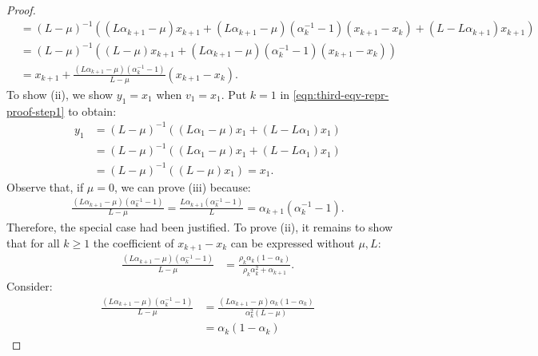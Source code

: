 \documentclass[12pt]{article}
\begin{document}
\begin{proof}
{\begin{align*}
                &= (L - \mu)^{-1}
                \left(
                    (L\alpha_{k + 1} - \mu)x_{k + 1} +
                    (L\alpha_{k + 1} - \mu)(\alpha_k^{-1} - 1)(x_{k + 1} - x_k)
                    + (L - L \alpha_{k + 1})x_{k + 1}
                \right)
                \\
                &=
                (L - \mu)^{-1}
                \left(
                    (L - \mu)x_{k + 1} + (L\alpha_{k + 1} - \mu)(\alpha_k^{-1} - 1)(x_{k + 1} - x_k)
                \right)
                \\
                &= x_{k + 1} + \frac{(L\alpha_{k + 1} - \mu)(\alpha_k^{-1} - 1)}{L - \mu}(x_{k + 1} - x_k).
            \end{align*}
            }
            To show (ii), we show $y_1 = x_1$ when $v_1 = x_1$.
            Put $k = 1$ in \eqref{eqn:third-eqv-repr-proof-step1} to obtain:
            \begin{align*}
                y_1 &= (L - \mu)^{-1}((L\alpha_1 - \mu)x_1 + (L - L\alpha_1)x_1)
                \\
                &= (L - \mu)^{-1}((L\alpha_1 - \mu)x_1 + (L - L \alpha_1)x_1)
                \\
                &= (L - \mu)^{-1}((L - \mu)x_1) = x_1.
            \end{align*}
            Observe that, if $\mu = 0$, we can prove (iii) because:
            \begin{align*}
                \frac{(L\alpha_{k + 1} - \mu)(\alpha_k^{-1} - 1)}{L - \mu} =
                \frac{L\alpha_{k +1}(\alpha_k^{-1} - 1)}{L} = \alpha_{k +1}(\alpha_k^{-1} - 1).
            \end{align*}
            Therefore, the special case had been justified.
            To prove (ii), it remains to show that for all $k\ge 1$ the coefficient of $x_{k + 1} - x_k$ can be expressed without $\mu, L$:
            \begin{align*}
                \frac{(L\alpha_{k + 1} - \mu)(\alpha_k^{-1} - 1)}{L - \mu}
                &= \frac{\rho_k\alpha_k(1 - \alpha_k)}{\rho_k\alpha_k^2 + \alpha_{k + 1}}.
            \end{align*}
            Consider:
            \begin{align*}
                \frac{(L\alpha_{k + 1} - \mu)(\alpha_k^{-1} - 1)}{L - \mu}
                &= \frac{(L\alpha_{k + 1} - \mu)\alpha_k(1 - \alpha_k)}{\alpha_k^2(L - \mu)}
                \\
                &=
                \alpha_k(1 - \alpha_k)

\end{align*}
\end{proof}
\end{document}
